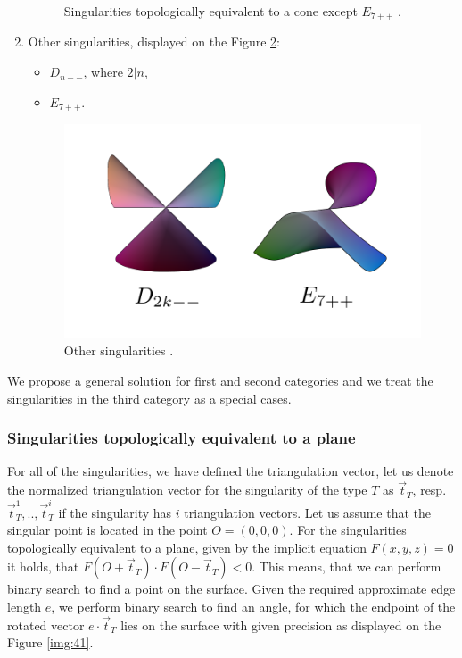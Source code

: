 \begin{enumerate}
\begin{figure}
        \caption[Singularities topologically equivalent to a cone except $E_{7++}$]
        {Singularities topologically equivalent to a cone except $E_{7++}$ \cite{morris2003client}.}
        \label{img:43}
    \end{figure}
    \item Other singularities, displayed on the Figure \ref{img:44}:
    \begin{itemize}
        \item $D_{n--}$, where $2|n$,
        \item $E_{7++}$.
    \end{itemize}
    \begin{figure}
        \centerline{\includegraphics[scale=0.5]{images/img44}}
        \caption[Other singularities]
        {Other singularities \cite{morris2003client}.}
        \label{img:44}
    \end{figure}
\end{enumerate}

We propose a general solution for first and second categories and we treat the
singularities in the third category as a special cases.

\subsubsection*{Singularities topologically equivalent to a plane}
For all of the singularities, we have defined the triangulation vector,
let us denote the normalized triangulation vector for the singularity of the type $T$
as $\vec{t}_T$, resp. $\vec{t}_T^1, .., \vec{t}_T^i$ if the singularity has
$i$ triangulation vectors.
Let us assume that the singular point is located in the point $O = (0, 0, 0).$
For the singularities topologically equivalent to a plane, given by the implicit
equation $F(x, y, z) = 0$ it holds, that $F(O+\vec{t}_T) \cdot F(O-\vec{t}_T)<0$.
This means, that we can perform binary search to find a point on the surface.
Given the required approximate edge length $e$, we perform binary search to find
an angle, for which the endpoint of the rotated vector $e \cdot \vec{t}_T$ lies on 
the surface with given precision as displayed on the Figure \ref{img:41}.

